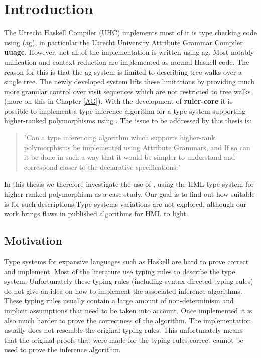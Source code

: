 \chapter{Introduction}
The Utrecht Haskell Compiler (UHC\cite{UHC}) implements most of it is type checking code using \ags (ag), in particular the Utrecht University Attribute Grammar Compiler \textbf{uuagc}\cite{uuagc}. However, not all of the implementation is written using ag. Most notably unification and context reduction are implemented as normal Haskell code. The reason for this is that the ag system is limited to describing tree walks over a single tree. The newly developed \rcore system lifts these limitations by providing much more granular control over visit sequences which are not restricted to tree walks (more on this in Chapter \ref{AG}). With the development of \textbf{ruler-core}\cite{ruler-front} it is possible to implement a type inference algorithm for a type system supporting higher-ranked polymorphisms using \ags. The issue to be addressed by this thesis is:

\begin{quotation}
"Can a type inferencing algorithm which supports higher-rank polymorphisms be implemented using Attribute Grammars, and If so can it be done in such a way that it would be simpler to understand and correspond closer to the declarative specifications."
\end{quotation}

In this thesis we therefore investigate the use of \rcore, using the HML type system  for higher-ranked polymorphism as a case study. Our goal is to find out how suitable \rcore is for such descriptions.Type systems variations are not explored, although our work brings flaws in published algorithms for HML to light.

\section{Motivation}
Type systems for expansive languages such as Haskell are hard to prove correct and implement. Most of the literature use typing rules to describe the type system. Unfortunately these typing rules (including syntax directed typing rules) do not give an idea on how to implement the associated inference algorithms. These typing rules usually contain a large amount of non-determinism and implicit assumptions that need to be taken into account.
Once implemented it is also much harder to prove the correctness of the algorithm. The implementation usually does not resemble the original typing rules. This unfortunately means that the original proofs that were made for the typing rules correct cannot be used to prove the inference algorithm.

